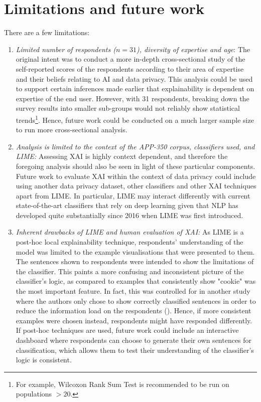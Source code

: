 \section{Limitations and future work}
There are a few limitations:
\begin{enumerate}
    \item \textit{Limited number of respondents ($n = 31$), diversity of expertise and age}: The original intent was to conduct a more in-depth cross-sectional study of the self-reported scores of the respondents according to their area of expertise and their beliefs relating to AI and data privacy. This analysis could be used to support certain inferences made earlier that explainability is dependent on expertise of the end user. However, with 31 respondents, breaking down the survey results into smaller sub-groups would not reliably show statistical trends\footnote{For example, Wilcoxon Rank Sum Test is recommended to be run on populations $> 20$.}. Hence, future work could be conducted on a much larger sample size to run more cross-sectional analysis.
    
    \item \textit{Analysis is limited to the context of the APP-350 corpus, classifiers used, and LIME:} Assessing XAI is highly context dependent, and therefore the foregoing analysis should also be seen in light of these particular components. Future work to evaluate XAI within the context of data privacy could include using another data privacy dataset, other classifiers and other XAI techniques apart from LIME. In particular, LIME may interact differently with current state-of-the-art classifiers that rely on deep learning given that NLP has developed quite substantially since 2016 when LIME was first introduced.
    
    \item \textit{Inherent drawbacks of LIME and human evaluation of XAI:} As LIME is a post-hoc local explainability technique, respondents' understanding of the model was limited to the example visualisations that were presented to them. The sentences shown to respondents were intended to show the limitations of the classifier. This paints a more confusing and inconsistent picture of the classifier's logic, as compared to examples that consistently show "cookie" was the most important feature. In fact, this was controlled for in another study where the authors only chose to show correctly classified sentences in order to reduce the information load on the respondents (\cite{gorski2021}). Hence, if more consistent examples were chosen instead, respondents might have responded differently. If post-hoc techniques are used, future work could include an interactive dashboard where respondents can choose to generate their own sentences for classification, which allows them to test their understanding of the classifier's logic is consistent.
    

\end{enumerate}
